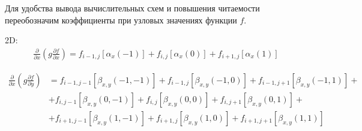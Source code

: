 Для удобства вывода вычислительных схем и повышения
читаемости переобозначим коэффициенты при узловых значениях
функции $f$.

2D:
\begin{equation*}
    \begin{split}
        \frac
            {\partial}
            {\partial x}
        \left(
            g
            \frac
                {\partial f}
                {\partial x}
        \right)
        =
        f_{i-1,j}
        \left[
            \alpha_{x} \left(-1\right)
        \right]
        +
        f_{i,j}
        \left[
            \alpha_{x} \left(0\right)
        \right]
        +
        f_{i+1,j}
        \left[
            \alpha_{x} \left(1\right)
        \right]
    \end{split}
\end{equation*}

\begin{equation*}
    \begin{split}
        \frac
            {\partial}
            {\partial x}
        \left(
            g
            \frac
                {\partial f}
                {\partial y}
        \right)
        &
        =
        f_{i-1, j-1}
        \left[
            \beta_{x,y} \left(-1, -1\right)
        \right]
        +
        f_{i-1,j}
        \left[
            \beta_{x,y} \left(-1, 0\right)
        \right]
        +
        f_{i-1, j+1}
        \left[
            \beta_{x,y} \left(-1, 1\right)
        \right]
        +
        \\
        &
        +
        f_{i, j-1}
        \left[
            \beta_{x,y} \left(0, -1\right)
        \right]
        +
        f_{i, j}
        \left[
            \beta_{x,y} \left(0, 0\right)
        \right]
        +
        f_{i, j+1}
        \left[
            \beta_{x,y} \left(0, 1\right)
        \right]
        +
        \\
        &
        +
        f_{i+1, j-1}
        \left[
            \beta_{x,y} \left(1, -1\right)
        \right]
        +
        f_{i+1, j}
        \left[
            \beta_{x,y} \left(1, 0\right)
        \right]
        +
        f_{i+1, j+1}
        \left[
            \beta_{x,y} \left(1, 1\right)
        \right]
    \end{split}
\end{equation*}


